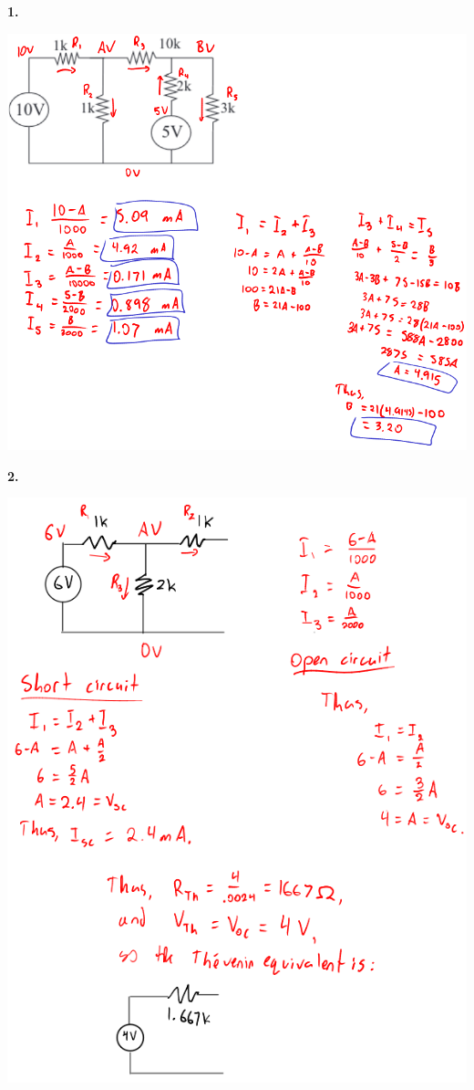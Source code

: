 \documentclass{article}
\begin{document}
\newpage\noindent\textbf{1.}
\begin{center}
    \includegraphics[scale=.7]{1.png}
\end{center}

\newpage\noindent\textbf{2.}
\begin{center}
    \includegraphics[scale=.7]{2.png}
\end{center}
\end{document}
